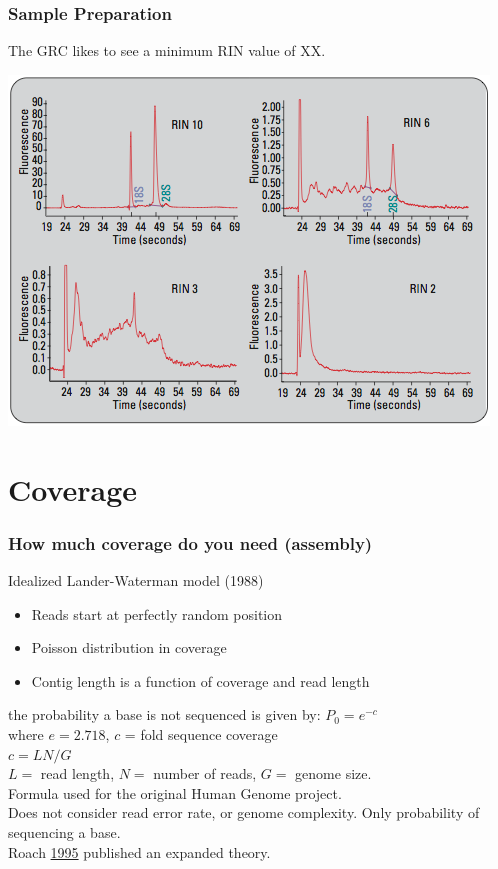 \documentclass[pdf]{beamer}
\begin{document}
\begin{frame}
\frametitle{Sample Preparation}
The GRC likes to see a minimum RIN value of XX.
\begin{center}
\includegraphics[scale=0.50]{Figures/RIN.png} 
\end{center}
\end{frame}

\section{Coverage}
\begin{frame}
\frametitle{How much coverage do you need (assembly)}
    Idealized Lander-Waterman model (1988)
    \begin{footnotesize}
    \begin{itemize}
    \item Reads start at perfectly random position
    \item Poisson distribution in coverage
    \item Contig length is a function of coverage and read length
    \end{itemize}
	\end{footnotesize}
the probability a base is not sequenced is given by: $P_0 = e^{-c}$\\
where $e = 2.718$, $c$ = fold sequence coverage\\
$c = LN/G$\\
$L = $ read length, $N = $ number of reads, $G = $ genome size.\\
Formula used for the original Human Genome project.\\

\alert{Does not consider read error rate, or genome complexity. Only probability of sequencing a base.} \\

Roach \href{http://genome.cshlp.org/content/5/5/464.long}{1995} published an expanded theory.\\

\end{frame}
\end{document}

